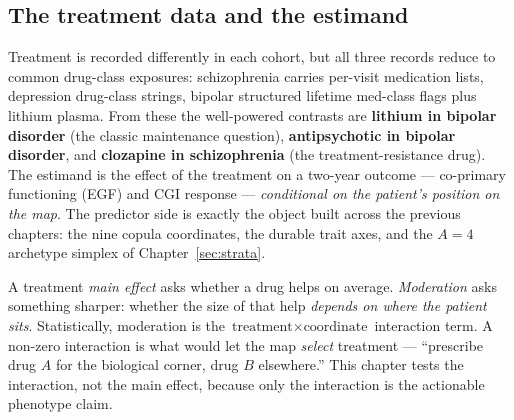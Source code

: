 \subsection{The treatment data and the estimand}
\label{sub:m5data}
Treatment is recorded differently in each cohort, but all three records reduce to common drug-class exposures:
schizophrenia carries per-visit medication lists, depression drug-class strings, bipolar structured lifetime
med-class flags plus lithium plasma. From these the well-powered contrasts are \textbf{lithium in bipolar
disorder} (the classic maintenance question), \textbf{antipsychotic in bipolar disorder}, and
\textbf{clozapine in schizophrenia} (the treatment-resistance drug). The estimand is the effect of the treatment
on a two-year outcome --- co-primary functioning (EGF) and CGI response --- \emph{conditional on the patient's
position on the map}. The predictor side is exactly the object built across the previous chapters: the nine
copula coordinates, the durable trait axes, and the $A{=}4$ archetype simplex of Chapter~\ref{sec:strata}.

\begin{definitionbox}
A treatment \emph{main effect} asks whether a drug helps on average. \emph{Moderation} asks something sharper:
whether the size of that help \emph{depends on where the patient sits}. Statistically, moderation is the
$\text{treatment}\times\text{coordinate}$ interaction term. A non-zero interaction is what would let the map
\emph{select} treatment --- ``prescribe drug $A$ for the biological corner, drug $B$ elsewhere.'' This chapter
tests the interaction, not the main effect, because only the interaction is the actionable phenotype claim.
\end{definitionbox}


